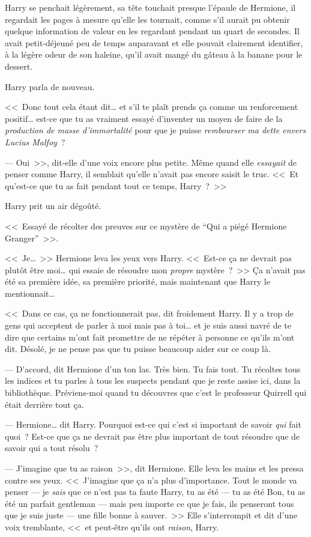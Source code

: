 Harry se penchait légèrement, sa tête touchait presque l'épaule de Hermione, il regardait les pages à mesure qu'elle les tournait, comme s'il aurait pu obtenir quelque information de valeur en les regardant pendant un quart de secondes. Il avait petit-déjeuné peu de temps auparavant et elle pouvait clairement identifier, à la légère odeur de son haleine, qu'il avait mangé du gâteau à la banane pour le dessert.

Harry parla de nouveau.

<<~Donc tout cela étant dit… et s'il te plaît prends ça comme un renforcement positif… est-ce que tu as vraiment essayé d'inventer un moyen de faire de la \emph{production de masse d'immortalité} pour que je puisse \emph{rembourser ma dette envers Lucius Malfoy}~?

--- Oui~>>, dit-elle d'une voix encore plus petite. Même quand elle \emph{essayait} de penser comme Harry, il semblait qu'elle n'avait pas encore saisit le truc. <<~Et qu'est-ce que tu as fait pendant tout ce temps, Harry~?~>>

Harry prit un air dégoûté.

<<~Essayé de récolter des preuves sur ce mystère de “Qui a piégé Hermione Granger”~>>.

<<~Je…~>> Hermione leva les yeux vers Harry. <<~Est-ce ça ne devrait pas plutôt être moi… qui essaie de résoudre mon \emph{propre} mystère~?~>> Ça n'avait pas été sa première idée, sa première priorité, mais maintenant que Harry le mentionnait…

<<~Dans ce cas, ça ne fonctionnerait pas, dit froidement Harry. Il y a trop de gens qui acceptent de parler à moi mais pas à toi… et je suis aussi navré de te dire que certains m'ont fait promettre de ne répéter à personne ce qu'ils m'ont dit. Désolé, je ne pense pas que tu puisse beaucoup aider sur ce coup là.

--- D'accord, dit Hermione d'un ton las. Très bien. Tu fais tout. Tu récoltes tous les indices et tu parles à tous les suspects pendant que je reste assise ici, dans la bibliothèque. Préviens-moi quand tu découvres que c'est le professeur Quirrell qui était derrière tout ça.

--- Hermione… dit Harry. Pourquoi est-ce qui c'est si important de savoir \emph{qui} fait quoi~? Est-ce que ça ne devrait pas être plus important de tout résoudre que de savoir qui a tout résolu~?

--- J'imagine que tu as raison~>>, dit Hermione. Elle leva les mains et les pressa contre ses yeux. <<~J'imagine que ça n'a plus d'importance. Tout le monde va penser — je \emph{sais} que ce n'est pas ta faute Harry, tu as été — tu as été Bon, tu as été un parfait gentleman — mais peu importe ce que je fais, ils penseront tous que je suis juste — une fille bonne à sauver.~>> Elle s'interrompit et dit d'une voix tremblante, <<~et peut-être qu'ils ont \emph{raison}, Harry.

